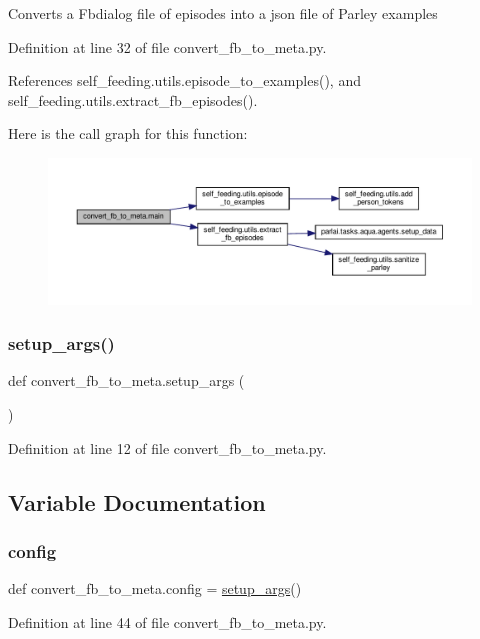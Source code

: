 \begin{DoxyVerb}Converts a Fbdialog file of episodes into a json file of Parley examples\end{DoxyVerb}
 

Definition at line 32 of file convert\+\_\+fb\+\_\+to\+\_\+meta.\+py.



References self\+\_\+feeding.\+utils.\+episode\+\_\+to\+\_\+examples(), and self\+\_\+feeding.\+utils.\+extract\+\_\+fb\+\_\+episodes().

Here is the call graph for this function\+:
\nopagebreak
\begin{figure}[H]
\begin{center}
\leavevmode
\includegraphics[width=350pt]{namespaceconvert__fb__to__meta_a6c4fef5a2121d218bf66955fe4025f6b_cgraph}
\end{center}
\end{figure}
\mbox{\label{namespaceconvert__fb__to__meta_ab2c8081cc658ecbcca1960069eb0ea73}} 
\subsubsection{\texorpdfstring{setup\+\_\+args()}{setup\_args()}}
{\footnotesize\ttfamily def convert\+\_\+fb\+\_\+to\+\_\+meta.\+setup\+\_\+args (\begin{DoxyParamCaption}{ }\end{DoxyParamCaption})}



Definition at line 12 of file convert\+\_\+fb\+\_\+to\+\_\+meta.\+py.



\subsection{Variable Documentation}
\mbox{\label{namespaceconvert__fb__to__meta_a3de7431f5a2c098e62a0d7e93b8931ab}} 
\subsubsection{\texorpdfstring{config}{config}}
{\footnotesize\ttfamily def convert\+\_\+fb\+\_\+to\+\_\+meta.\+config = \hyperlink{namespaceconvert__fb__to__meta_ab2c8081cc658ecbcca1960069eb0ea73}{setup\+\_\+args}()}



Definition at line 44 of file convert\+\_\+fb\+\_\+to\+\_\+meta.\+py.

